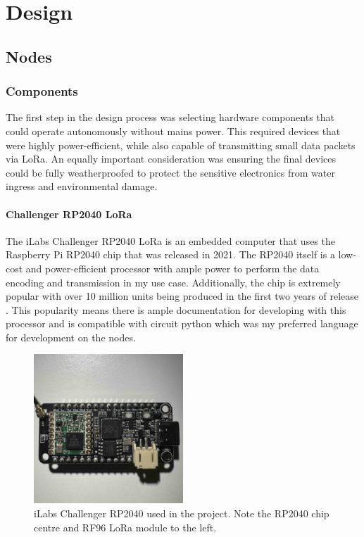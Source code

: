 \section{Design}

\subsection{Nodes}

\subsubsection{Components}

The first step in the design process was selecting hardware components that
could operate autonomously without mains power. This required devices that were
highly power-efficient, while also capable of transmitting small data
packets via LoRa. An equally important consideration was ensuring the final
devices could be fully weatherproofed to protect the sensitive electronics from
water ingress and environmental damage.

\paragraph{Challenger RP2040 LoRa}

The iLabs Challenger RP2040 LoRa is an embedded computer that uses the Raspberry Pi
RP2040 chip that was released in 2021. The RP2040 itself is a low-cost and
power-efficient processor with ample power to perform the data encoding and
transmission in my use case. Additionally, the chip is extremely popular with
over 10 million units being produced in the first two years of release
\cite{pounder2023}. This popularity means there is ample documentation for
developing with this processor and is compatible with circuit python which was
my preferred language for development on the nodes.

\begin{figure}[H]
    \centering
    \includegraphics[width=0.5\textwidth]{contents/22-hw-design/22-fig/challenger-rp2040.jpg}
    \caption{iLabs Challenger RP2040 used in the project. Note the RP2040 chip centre and RF96 LoRa module to the left.}
\end{figure}

